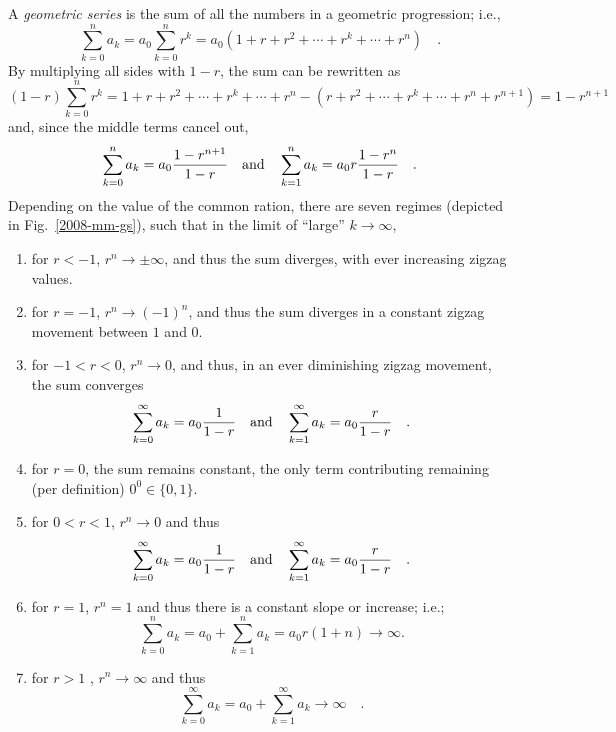 \documentclass[aps,rmp,preprint,amsfonts,showpacs,showkeys]{revtex4}
\begin{document}
A {\em geometric series} is the sum of all the numbers in a geometric progression; i.e.,
$$\sum_{k=0}^n a_k = a_0 \sum_{k=0}^n r^k=a_0(1+r+r^2+ \cdots +r^k+ \cdots +r^n)\quad .$$
By multiplying all sides with $1-r$,
the sum can be rewritten as
$$(1-r) \sum_{k=0}^n r^k=1+ r+r^2+ \cdots +r^k+ \cdots +r^n - (r+r^2+ \cdots +r^k+ \cdots +r^n +r^{n+1}) = 1-r^{n+1}$$
and, since the middle terms cancel out,
$$\sum_{k=0}^n a_k =a_0 {1-r^{n+1}\over 1-r}  \quad \mathrm{ and }\quad  \sum_{k=1}^n a_k =a_0 r{1-r^{n}\over 1-r}\quad .$$
Depending on the value of the common ration, there are seven regimes (depicted in Fig.~\ref{2008-mm-gs}),
such that in the limit of ``large'' $k \rightarrow \infty $,
\renewcommand{\labelenumi}{(\roman{enumi})}
\begin{enumerate}
\item
for $r < -1$,
$r^{n}\rightarrow \pm \infty$, and thus the sum diverges, with ever increasing zigzag values.

\item
for $r = -1$,
$r^{n}\rightarrow (-1)^n$, and thus the sum diverges in a constant zigzag movement between $1$ and $0$.

\item
for $-1 < r < 0$,
$r^{n}\rightarrow 0$, and thus, in an ever diminishing zigzag movement, the sum converges
$$\sum_{k=0}^\infty a_k = a_0 {1\over 1-r} \quad \mathrm{ and }\quad   \sum_{k=1}^\infty a_k = a_0 {r\over 1-r}\quad .$$

\item
for $r = 0$,
the sum remains constant, the only term contributing remaining (per definition) $0^0\in \{0,1\}$.

\item
for $0 < r < 1$,
$r^{n}\rightarrow 0$ and thus
$$\sum_{k=0}^\infty a_k = a_0 {1\over 1-r} \quad \mathrm{ and }\quad   \sum_{k=1}^\infty a_k = a_0 {r\over 1-r}\quad .$$

\item
for $r = 1$,
$r^{n}= 1$ and thus there is a constant slope or increase; i.e.;
$$\sum_{k=0}^n a_k = a_0 + \sum_{k=1}^n a_k = a_0 r (1+n) \rightarrow \infty .$$

\item
for $r > 1$ ,
$r^{n}\rightarrow \infty$ and thus
$$\sum_{k=0}^\infty a_k = a_0 +\sum_{k=1}^\infty a_k \rightarrow \infty \quad .$$

\end{enumerate}
\end{document}
